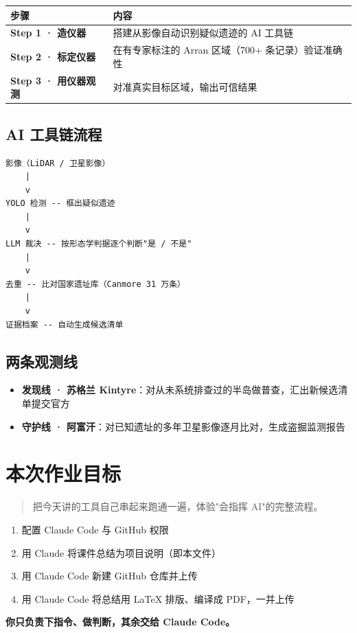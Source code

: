 \documentclass[11pt]{article}
\begin{document}
\begin{table}[h]
\centering
\begin{tabular}{>{\bfseries}p{3.5cm} p{10cm}}
\toprule
步骤 & 内容 \\
\midrule
Step 1 · 造仪器 & 搭建从影像自动识别疑似遗迹的 AI 工具链 \\
Step 2 · 标定仪器 & 在有专家标注的 Arran 区域（700+ 条记录）验证准确性 \\
Step 3 · 用仪器观测 & 对准真实目标区域，输出可信结果 \\
\bottomrule
\end{tabular}
\end{table}

\subsection*{AI 工具链流程}

\begin{verbatim}
影像（LiDAR / 卫星影像）
    |
    v
YOLO 检测 -- 框出疑似遗迹
    |
    v
LLM 裁决 -- 按形态学判据逐个判断"是 / 不是"
    |
    v
去重 -- 比对国家遗址库（Canmore 31 万条）
    |
    v
证据档案 -- 自动生成候选清单
\end{verbatim}

\subsection*{两条观测线}

\begin{itemize}
    \item \textbf{发现线 · 苏格兰 Kintyre}：对从未系统排查过的半岛做普查，汇出新候选清单提交官方
    \item \textbf{守护线 · 阿富汗}：对已知遗址的多年卫星影像逐月比对，生成盗掘监测报告
\end{itemize}

\section{本次作业目标}

\begin{quote}
把今天讲的工具自己串起来跑通一遍，体验"会指挥 AI"的完整流程。
\end{quote}

\begin{enumerate}
    \item 配置 Claude Code 与 GitHub 权限
    \item 用 Claude 将课件总结为项目说明（即本文件）
    \item 用 Claude Code 新建 GitHub 仓库并上传
    \item 用 Claude Code 将总结用 LaTeX 排版、编译成 PDF，一并上传
\end{enumerate}

\begin{center}
\textbf{你只负责下指令、做判断，其余交给 Claude Code。}
\end{center}
\end{document}
